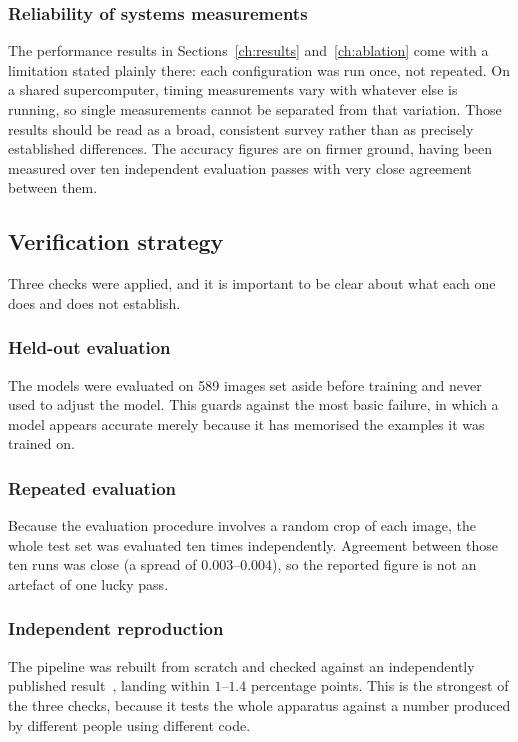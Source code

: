 \subsubsection{Reliability of systems measurements}
The performance results in Sections~\ref{ch:results} and~\ref{ch:ablation} come
with a limitation stated plainly there: each configuration was run once, not
repeated. On a shared supercomputer, timing measurements vary with whatever
else is running, so single measurements cannot be separated from that
variation. Those results should be read as a broad, consistent survey rather
than as precisely established differences. The accuracy figures are on firmer
ground, having been measured over ten independent evaluation passes with very
close agreement between them.

\subsection{Verification strategy}
\label{sec:arch-verification}

Three checks were applied, and it is important to be clear about what each one
does and does not establish.

\subsubsection{Held-out evaluation}
The models were evaluated on 589 images set aside before training and never
used to adjust the model. This guards against the most basic failure, in which
a model appears accurate merely because it has memorised the examples it was
trained on.

\subsubsection{Repeated evaluation}
Because the evaluation procedure involves a random crop of each image, the
whole test set was evaluated ten times independently. Agreement between those
ten runs was close (a spread of $0.003$--$0.004$), so the reported figure is not
an artefact of one lucky pass.

\subsubsection{Independent reproduction}
The pipeline was rebuilt from scratch and checked against an independently
published result~\cite{Casini23}, landing within $1$--$1.4$ percentage points.
This is the strongest of the three checks, because it tests the whole apparatus
against a number produced by different people using different code.

